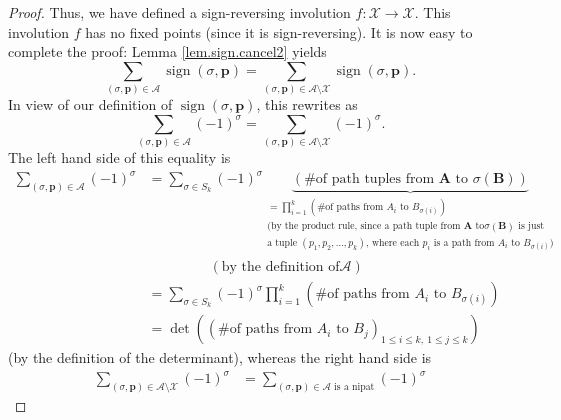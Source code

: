 \begin{definition}
\begin{proof}
Thus, we have defined a sign-reversing involution $f:\mathcal{X}%
\rightarrow\mathcal{X}$. This involution $f$ has no fixed points (since it is
sign-reversing). It is now easy to complete the proof: Lemma
\ref{lem.sign.cancel2} yields%
\[
\sum_{\left(  \sigma,\mathbf{p}\right)  \in\mathcal{A}}\operatorname*{sign}%
\left(  \sigma,\mathbf{p}\right)  =\sum_{\left(  \sigma,\mathbf{p}\right)
\in\mathcal{A}\setminus\mathcal{X}}\operatorname*{sign}\left(  \sigma
,\mathbf{p}\right)  .
\]
In view of our definition of $\operatorname*{sign}\left(  \sigma
,\mathbf{p}\right)  $, this rewrites as%
\begin{equation}
\sum_{\left(  \sigma,\mathbf{p}\right)  \in\mathcal{A}}\left(  -1\right)
^{\sigma}=\sum_{\left(  \sigma,\mathbf{p}\right)  \in\mathcal{A}%
\setminus\mathcal{X}}\left(  -1\right)  ^{\sigma}.
\label{pf.prop.lgv.kpaths.count.at}%
\end{equation}
The left hand side of this equality is%
\begin{align*}
\sum_{\left(  \sigma,\mathbf{p}\right)  \in\mathcal{A}}\left(  -1\right)
^{\sigma}  &  =\sum_{\sigma\in S_{k}}\left(  -1\right)  ^{\sigma
}\underbrace{\left(  \text{\# of path tuples from }\mathbf{A}\text{ to }%
\sigma\left(  \mathbf{B}\right)  \right)  }_{\substack{=\prod_{i=1}^{k}\left(
\text{\# of paths from }A_{i}\text{ to }B_{\sigma\left(  i\right)  }\right)
\\\text{(by the product rule, since a path tuple from }\mathbf{A}\text{ to
}\sigma\left(  \mathbf{B}\right)  \text{ is just}\\\text{a tuple }\left(
p_{1},p_{2},\ldots,p_{k}\right)  \text{, where each }p_{i}\text{ is a path
from }A_{i}\text{ to }B_{\sigma\left(  i\right)  }\text{)}}}\\
&  \ \ \ \ \ \ \ \ \ \ \ \ \ \ \ \ \ \ \ \ \left(  \text{by the definition of
}\mathcal{A}\right) \\
&  =\sum_{\sigma\in S_{k}}\left(  -1\right)  ^{\sigma}\prod_{i=1}^{k}\left(
\text{\# of paths from }A_{i}\text{ to }B_{\sigma\left(  i\right)  }\right) \\
&  =\det\left(  \left(  \text{\# of paths from }A_{i}\text{ to }B_{j}\right)
_{1\leq i\leq k,\ 1\leq j\leq k}\right)
\end{align*}
(by the definition of the determinant), whereas the right hand side is%
\begin{align*}
\sum_{\left(  \sigma,\mathbf{p}\right)  \in\mathcal{A}\setminus\mathcal{X}%
}\left(  -1\right)  ^{\sigma}  &  =\sum_{\left(  \sigma,\mathbf{p}\right)
\in\mathcal{A}\text{ is a nipat}}\left(  -1\right)  ^{\sigma}%

\end{align*}
\end{proof}
\end{definition}
